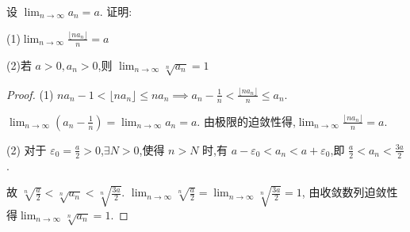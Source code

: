 \begin{practice}
    设 $\lim_{n\to\infty} a_n=a$. 证明:

    (1)$\lim_{n\to\infty} \frac{\lfloor na_n\rfloor}{n}=a$

    (2)若 $a>0,a_n>0$,则 $\lim_{n\to\infty} \sqrt[n]{a_n}=1$
\end{practice}

\begin{proof}
    (1) $na_n-1<\lfloor na_n \rfloor \le na_n \implies a_n-\frac{1}{n}<\frac{\lfloor na_n\rfloor}{n}\le a_n$.

    $\lim_{n\to\infty} (a_n-\frac{1}{n}) = \lim_{n\to\infty} a_n =a$. 由极限的迫敛性得,$\lim_{n\to\infty} \frac{\lfloor na_n\rfloor}{n}=a$.

    (2) 对于 $\varepsilon_0=\frac{a}{2}>0$,$\exists N>0$,使得 $n>N$ 时,有 $a-\varepsilon_0<a_n<a+\varepsilon_0$,即 $\frac{a}{2}<a_n<\frac{3a}{2}$. 
    
    故 $\sqrt[n]{\frac{a}{2}}<\sqrt[n]{a_n}<\sqrt[n]{\frac{3a}{2}}$. $\lim_{n\to\infty} \sqrt[n]{\frac{a}{2}}=\lim_{n\to\infty} \sqrt[n]{\frac{3a}{2}}=1$, 由收敛数列迫敛性得$\lim_{n\to\infty} \sqrt[n]{a_n}=1$.
\end{proof}

\newsection